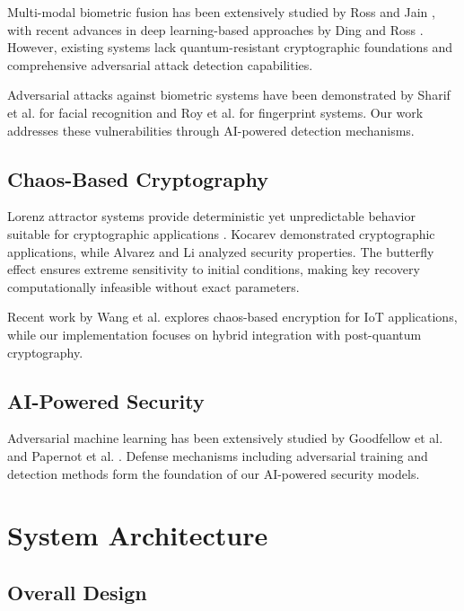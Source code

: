 \documentclass[12pt,a4paper]{article}
\begin{document}
Multi-modal biometric fusion has been extensively studied by Ross and Jain \cite{ross2003information}, with recent advances in deep learning-based approaches by Ding and Ross \cite{ding2019deep}. However, existing systems lack quantum-resistant cryptographic foundations and comprehensive adversarial attack detection capabilities.

Adversarial attacks against biometric systems have been demonstrated by Sharif et al. \cite{sharif2016accessorize} for facial recognition and Roy et al. \cite{roy2019masterprint} for fingerprint systems. Our work addresses these vulnerabilities through AI-powered detection mechanisms.

\subsection{Chaos-Based Cryptography}

Lorenz attractor systems provide deterministic yet unpredictable behavior suitable for cryptographic applications \cite{lorenz1963deterministic}. Kocarev \cite{kocarev2001chaos} demonstrated cryptographic applications, while Alvarez and Li \cite{alvarez2006some} analyzed security properties. The butterfly effect ensures extreme sensitivity to initial conditions, making key recovery computationally infeasible without exact parameters.

Recent work by Wang et al. \cite{wang2019chaos} explores chaos-based encryption for IoT applications, while our implementation focuses on hybrid integration with post-quantum cryptography.

\subsection{AI-Powered Security}

Adversarial machine learning has been extensively studied by Goodfellow et al. \cite{goodfellow2014explaining} and Papernot et al. \cite{papernot2016limitations}. Defense mechanisms including adversarial training \cite{madry2017towards} and detection methods \cite{li2017adversarial} form the foundation of our AI-powered security models.

\section{System Architecture}

\subsection{Overall Design}
\end{document}

